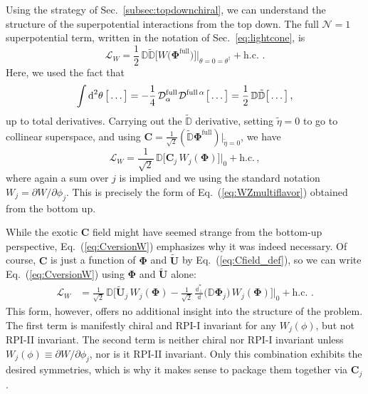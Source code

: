 \documentclass[12pt,document,nofootinbib,superscriptaddress,onecolumn,preprintnumbers,balancelastpage]{article}
\newcommand{\full}{\text{full}}
\newcommand{\s}{\hspace{0.8pt}}
\newcommand{\PP}{\mathbb{d}}
\DeclareRobustCommand{\Sec}[1]{Sec.~\ref{#1}}
\DeclareRobustCommand{\Eq}[1]{Eq.~(\ref{#1})}
\newcommand{\bPhi}{ \boldsymbol \Phi}
\newcommand{\bC}{ \boldsymbol C}
\newcommand{\bU}{ \tilde{\boldsymbol U}}
\newcommand{\D}{\mathbb{D}}
\begin{document}
\begin{spacing}{1.2}
Using the strategy of \Sec{subsec:topdownchiral}, we can understand the structure of the superpotential interactions from the top down.
%
The full $\mathcal{N} = 1$ superpotential term, written in the notation of \Sec{eq:lightcone}, is
%
\begin{equation}
\mathcal{L}_W =  \frac{1}{2}\, \D \tilde{\D}  \bigg[ W\big(\bPhi^\full\big) \bigg] \bigg|_{\theta = 0 = \theta^\dagger} + \text{h.c.}\,\,.
\end{equation}
%
Here, we used the fact that
%
\begin{equation}
\int \text{d}^2 \theta\, \big[\dots \big] = -\frac{1}{4}\, \mathcal{D}^\full_\alpha\s \mathcal{D}^{\full \,\alpha}\s \big[\dots \big] = \frac{1}{2} \,\D \tilde{\D}  \big[\dots \big] \,,
\end{equation}
%
up to total derivatives. Carrying out the $\tilde{\D}$ derivative, setting $\tilde{\eta} = 0$ to go to collinear superspace, and using $\bC = \frac{1}{\sqrt{2}} (\tilde{\D} \bPhi^\full)|_{\tilde{\eta} = 0}$, we have
%
\begin{equation}
\label{eq:CversionW}
\mathcal{L}_W = \frac{1}{\sqrt{2}}\, \D \bigg[  \bC_j\, W_j(\bPhi) \bigg] \bigg|_{0} + \text{h.c.} \,,
\end{equation}
%
where again a sum over $j$ is implied and we using the standard notation $W_j = \partial W / \partial \phi_j$. 
%
This is precisely the form of \Eq{eq:WZmultiflavor} obtained from the bottom up.


While the exotic $\bC$ field might have seemed strange from the bottom-up perspective, \Eq{eq:CversionW} emphasizes why it was indeed necessary.
%
Of course, $\bC$ is just a function of $\bPhi$ and $\bU$ by \Eq{eq:Cfield_def}, so we can write \Eq{eq:CversionW} using $\bPhi$ and $\bU$ alone:
%
\begin{align}
\label{eq:UversionW}
\mathcal{L}_W &=\frac{1}{\sqrt{2}} \,\D \bigg[ \bU_j\, W_j(\bPhi) - \frac{1}{\sqrt{2}}\, \frac{\PP_\perp^*}{\PP} \big(\D \bPhi_j \big)\, W_j(\bPhi)  \bigg] \bigg|_{0} + \text{h.c.}\,\,.
\end{align}
%
This form, however, offers no additional insight into the structure of the problem.
%
The first term is manifestly chiral and RPI-I invariant for any $W_j(\phi)$, but not RPI-II invariant.
%
The second term is neither chiral nor RPI-I invariant unless $W_j(\phi) \equiv \partial W / \partial \phi_j$, nor is it RPI-II invariant.
%
Only this combination exhibits the desired symmetries, which is why it makes sense to package them together via $\bC_j$.





\end{spacing}
\end{document}
